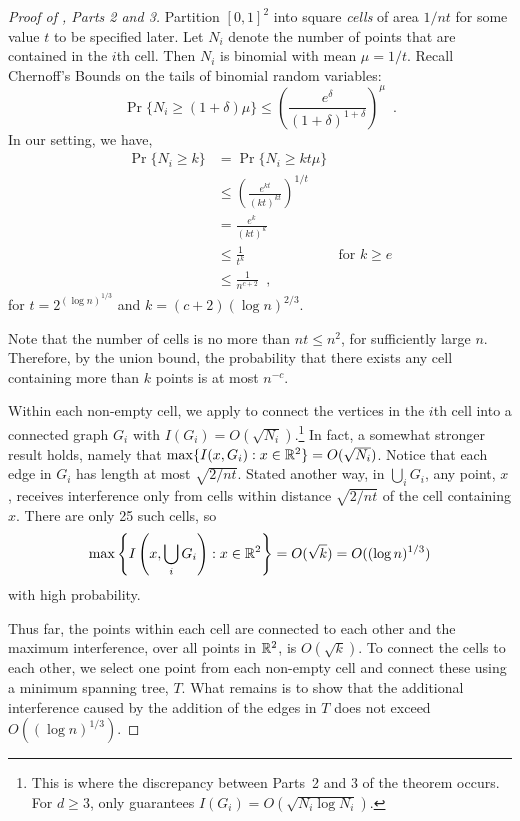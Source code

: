 \documentclass{cccg12}
\begin{document}
\begin{proof}[Proof of , Parts 2 and 3]
Partition $[0,1]^2$ into square \emph{cells} of area $1/nt$ for some
value $t$ to be specified later.  Let $N_i$ denote the number of points
that are contained in the $i$th cell.  Then $N_i$ is binomial
with mean $\mu=1/t$.  Recall Chernoff's Bounds \cite{c52} on the tails
of binomial random variables:
\[
  \Pr\{N_i \ge (1+\delta)\mu\} 
    \le \left(\frac{e^\delta}{(1+\delta)^{1+\delta}}\right)^\mu \enspace .
\]
In our setting, we have, 
\begin{align*}
  \Pr\{N_i \ge k\} 
    & = \Pr\{N_i \ge kt\mu\} \\
    & \le \left(\frac{e^{kt}}{(kt)^{kt}}\right)^{1/t} \\
    & = \frac{e^{k}}{(kt)^{k}} \\
    & \le \frac{1}{t^{k}} & \text{for $k\ge e$} \\
    & \le \frac{1}{n^{c+2}} \enspace , 
\end{align*}
for $t=2^{(\log n)^{1/3}}$ and $k=(c+2)(\log n)^{2/3}$.

Note that the number of cells is no more than $nt\le
n^2$, for sufficiently large $n$.  Therefore, by the union bound, the
probability that there exists any cell containing more than $k$ points
is at most $n^{-c}$.

Within each non-empty cell, we apply  to
connect the vertices in the $i$th cell into a connected graph $G_i$
with $I(G_i)=O(\sqrt{N_i})$.\footnote{This is where the discrepancy between Parts~2 and 3 of the theorem occurs.  For $d\ge 3$,  only guarantees $I(G_i)=O(\sqrt{N_i\log N_i})$.}  In fact, a somewhat stronger result holds,
namely that $\max\{I(x,G_i) : x\in\mathbb{R}^2\}=O(\sqrt{N_i})$.  Notice that
each edge in $G_i$ has length at most $\sqrt{2/nt}$.  Stated another
way, in $\bigcup_i G_i$, any point, $x$, receives interference only
from cells within distance $\sqrt{2/nt}$ of the cell containing $x$.
There are only 25 such cells, so
\[
  \max\left\{I\left(x,\bigcup_iG_i\right) : x\in\mathbb{R}^2\right\}=O(\sqrt{k}) 
    = O((\log n)^{1/3})
\]
with high probability.

Thus far, the points within each cell are connected to each other and
the maximum interference, over all points in $\mathbb{R}^2$, is $O(\sqrt{k})$.
To connect the cells to each other, we select one point from each
non-empty cell and connect these using a minimum spanning tree, $T$.
What remains is to show that the additional interference caused by the
addition of the edges in $T$ does not exceed $O((\log n)^{1/3})$.


\end{proof}
\end{document}

